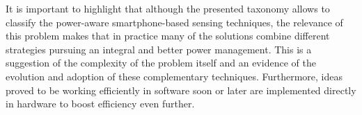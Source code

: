 \documentclass[ENG,PhD]{cinvestav}
\begin{document}



It is important to highlight that although the presented taxonomy allows to classify the power-aware smartphone-based sensing techniques, the relevance of this problem makes that in practice many of the solutions combine different strategies pursuing an integral and better power management.
This is a suggestion of the complexity of the problem itself and an evidence of the evolution and adoption of these complementary techniques.
Furthermore, ideas proved to be working efficiently in software soon or later are implemented directly in hardware to boost efficiency even further. 
\end{document}
